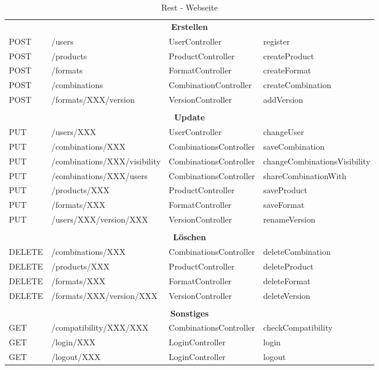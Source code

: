 \begin{table}[h]
\begin{tabularx}{\textwidth}{l l l l}
		\multicolumn{4}{c}{\textbf{Erstellen}}\\
		\rowcolor[HTML]{E7E7E7}
		POST & /users & UserController & register \\
		POST & /products & ProductController & createProduct \\
		\rowcolor[HTML]{E7E7E7}
		POST & /formats & FormatController & createFormat \\
		POST & /combinations & CombinationController & createCombination \\
		\rowcolor[HTML]{E7E7E7}
		POST & /formats/XXX/version & VersionController & addVersion \\
		\\
		\multicolumn{4}{c}{\textbf{Update}}\\
		PUT & /users/XXX & UserController & changeUser \\
		\rowcolor[HTML]{E7E7E7}
		PUT & /combinations/XXX & CombinationsController & saveCombination \\
		PUT & /combinations/XXX/visibility & CombinationsController & changeCombinationsVisibility \\
		\rowcolor[HTML]{E7E7E7}
		PUT & /combinations/XXX/users & CombinationsController & shareCombinationWith \\
		PUT & /products/XXX & ProductController & saveProduct \\
		\rowcolor[HTML]{E7E7E7}
		PUT & /formats/XXX & FormatController & saveFormat \\
		PUT & /users/XXX/version/XXX & VersionController & renameVersion \\
		\\
		\multicolumn{4}{c}{\textbf{Löschen}}\\
		\rowcolor[HTML]{E7E7E7}
		DELETE & /combinations/XXX & CombinationsController & deleteCombination \\
		DELETE & /products/XXX & ProductController & deleteProduct \\
		\rowcolor[HTML]{E7E7E7}
		DELETE & /formats/XXX & FormatController & deleteFormat \\
		DELETE & /formats/XXX/version/XXX & VersionController & deleteVersion \\
		\\
		\multicolumn{4}{c}{\textbf{Sonstiges}}\\
		\rowcolor[HTML]{E7E7E7}
		GET & /compatibility/XXX/XXX & CombinationsController & checkCompatibility \\
		GET & /login/XXX & LoginController & login \\
		\rowcolor[HTML]{E7E7E7}
		GET & /logout/XXX & LoginController & logout \\

	\end{tabularx}
	\caption{Rest - Webseite}
	\label{table:rest-webseite}
\end{table}


